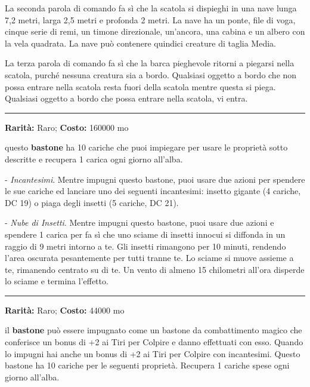 \begin{multicols}{2}
La seconda parola di comando fa sì che la scatola si dispieghi in una nave lunga 7,2 metri, larga 2,5 metri e profonda 2 metri. La nave ha un ponte, file di voga, cinque serie di remi, un timone direzionale, un'ancora, una cabina e un albero con la vela quadrata. La nave può contenere quindici creature di taglia Media.

La terza parola di comando fa sì che la barca pieghevole ritorni a piegarsi nella scatola, purché nessuna creatura sia a bordo. Qualsiasi oggetto a bordo che non possa entrare nella scatola resta fuori della scatola mentre questa si piega. Qualsiasi oggetto a bordo che possa entrare nella scatola, vi entra.

\smallskip\noindent\rule{\linewidth}{2pt}  \hypertarget{BastonedegliInsettiSciamanti}{}\smallskip{}\noindent\label{BastonedegliInsettiSciamanti}

\textbf{Rarità:} Raro; \textbf{Costo:} 160000 mo

questo \textbf{bastone} ha 10 cariche che puoi impiegare per usare le proprietà sotto descritte e recupera 1 carica ogni giorno all'alba.

- \emph{Incantesimi}. Mentre impugni questo bastone, puoi usare due azioni per spendere le sue cariche ed lanciare uno dei seguenti incantesimi: insetto gigante (4 cariche, DC 19) o piaga degli insetti (5 cariche, DC 21).

- \emph{Nube di Insetti}. Mentre impugni questo bastone, puoi usare due azioni e spendere 1 carica per fa sì che uno sciame di insetti innocui si diffonda in un raggio di 9 metri intorno a te. Gli insetti rimangono per 10 minuti, rendendo l'area oscurata pesantemente per tutti tranne te. Lo sciame si muove assieme a te, rimanendo centrato su di te. Un vento di almeno 15 chilometri all'ora disperde lo sciame e termina l'effetto.

\smallskip\noindent\rule{\linewidth}{2pt}  \hypertarget{BastonedeiBoschi}{}\smallskip{}\noindent\label{BastonedeiBoschi}

\textbf{Rarità:} Raro; \textbf{Costo:} 44000 mo

il \textbf{bastone} può essere impugnato come un bastone da combattimento magico che conferisce un bonus di +2 ai Tiri per Colpire e danno effettuati con esso. Quando lo impugni hai anche un bonus di +2 ai Tiri per Colpire con incantesimi.
Questo bastone ha 10 cariche per le seguenti proprietà. Recupera 1 cariche spese ogni giorno all'alba.


\end{multicols}
